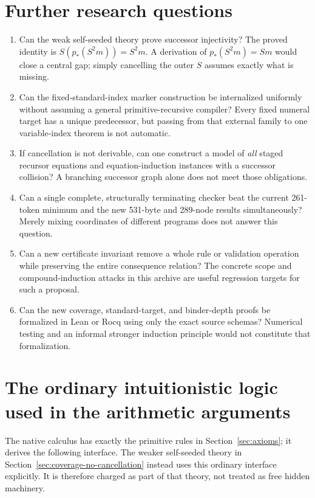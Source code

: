 \documentclass[11pt]{article}
\theoremstyle{definition}\newtheorem{definition}[theorem]{Definition}
\begin{document}
\section{Further research questions}
\begin{enumerate}
\item Can the weak self-seeded theory prove successor injectivity?
The proved identity is $S(p_*(S^2m))=S^2m$. A derivation of
$p_*(S^2m)=Sm$ would close a central gap; simply cancelling the outer
$S$ assumes exactly what is missing.
\item Can the fixed-standard-index marker construction be internalized
uniformly without assuming a general primitive-recursive compiler?
Every fixed numeral target has a unique predecessor, but passing from
that external family to one variable-index theorem is not automatic.
\item If cancellation is not derivable, can one construct a model of
\emph{all} staged recursor equations and equation-induction instances
with a successor collision? A branching successor graph alone does not
meet those obligations.
\item Can a single complete, structurally terminating checker beat the
current 261-token minimum and the new 531-byte and 289-node results
simultaneously? Merely mixing coordinates of different programs does
not answer this question.
\item Can a new certificate invariant remove a whole rule or validation
operation while preserving the entire consequence relation? The concrete
scope and compound-induction attacks in this archive are useful regression
targets for such a proposal.
\item Can the new coverage, standard-target, and binder-depth proofs be
formalized in Lean or Rocq using only the exact source schemas? Numerical
testing and an informal stronger induction principle would not constitute
that formalization.
\end{enumerate}

\appendix
\section{The ordinary intuitionistic logic used in the arithmetic arguments}
\label{sec:ordinary-rules}
The native calculus has exactly the primitive rules in
Section~\ref{sec:axioms}; it derives the following interface. The weaker
self-seeded theory in Section~\ref{sec:coverage-no-cancellation} instead
uses this ordinary interface explicitly. It is therefore charged as part
of that theory, not treated as free hidden machinery.
\end{document}
